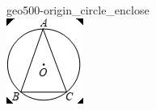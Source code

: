 \documentclass[12pt]{article}
\begin{document}
\begin{center}
\begin{minipage}{0.32\textwidth}
\end{minipage}
\hfill\begin{minipage}{0.32\textwidth}\centering
geo500-origin\_circle\_enclose\\
\includegraphics[width=0.95\linewidth]{out_rommath_origin/items/geo500-origin/assets/figure_circle.png}
\end{minipage}
\par
\end{center}
\bigskip
\end{document}
